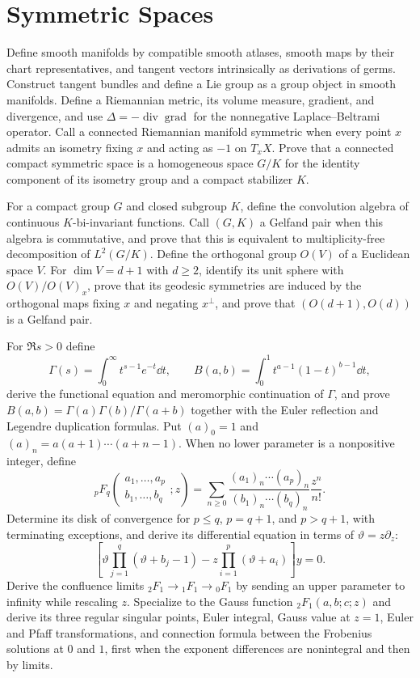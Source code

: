 \section{Symmetric Spaces}

\begin{exercise}
Define smooth manifolds by compatible smooth atlases, smooth maps by their
chart representatives, and tangent vectors intrinsically as derivations of
germs.  Construct tangent bundles and define a Lie group as a group object in
smooth manifolds.  Define a Riemannian metric, its volume measure, gradient,
and divergence, and use
$\Delta=-\operatorname{div}\operatorname{grad}$ for the nonnegative
Laplace--Beltrami operator.  Call a connected Riemannian manifold symmetric
when every point $x$ admits an isometry fixing $x$ and acting as $-1$ on
$T_xX$.  Prove that a connected compact symmetric space is a homogeneous
space $G/K$ for the identity component of its isometry group and a compact
stabilizer $K$.

For a compact group $G$ and closed subgroup $K$, define the convolution
algebra of continuous $K$-bi-invariant functions.  Call $(G,K)$ a Gelfand
pair when this algebra is commutative, and prove that this is equivalent to
multiplicity-free decomposition of $L^2(G/K)$.  Define the orthogonal group
$O(V)$ of a Euclidean space $V$.  For $\dim V=d+1$ with $d\geq2$, identify
its unit sphere with $O(V)/O(V)_x$, prove that its geodesic symmetries are induced by the
orthogonal maps fixing $x$ and negating $x^\perp$, and prove that
$(O(d+1),O(d))$ is a Gelfand pair.
\end{exercise}

\begin{exercise}
For $\Re s>0$ define
\[
 \Gamma(s)=\int_0^\infty t^{s-1}e^{-t}\dd t,
 \qquad
 B(a,b)=\int_0^1t^{a-1}(1-t)^{b-1}\dd t,
\]
derive the functional equation and meromorphic continuation of $\Gamma$, and
prove $B(a,b)=\Gamma(a)\Gamma(b)/\Gamma(a+b)$ together with the Euler
reflection and Legendre duplication formulas.  Put
$(a)_0=1$ and $(a)_n=a(a+1)\cdots(a+n-1)$.  When no lower parameter is a
nonpositive integer, define
\[
 {}_pF_q\!\left(\begin{matrix}a_1,\ldots,a_p\\b_1,\ldots,b_q\end{matrix};z\right)
 =\sum_{n\geq0}\frac{(a_1)_n\cdots(a_p)_n}
 {(b_1)_n\cdots(b_q)_n}\frac{z^n}{n!}.
\]
Determine its disk of convergence for $p\leq q$, $p=q+1$, and $p>q+1$, with
terminating exceptions, and derive its differential equation in terms of
$\vartheta=z\partial_z$:
\[
 \left[\vartheta\prod_{j=1}^q(\vartheta+b_j-1)
 -z\prod_{i=1}^p(\vartheta+a_i)\right]y=0.
\]
Derive the confluence limits ${}_2F_1\to{}_1F_1\to{}_0F_1$ by sending an
upper parameter to infinity while rescaling $z$.  Specialize to the Gauss
function ${}_2F_1(a,b;c;z)$ and
derive its three regular singular points, Euler integral, Gauss value at
$z=1$, Euler and Pfaff transformations, and connection formula between the
Frobenius solutions at $0$ and $1$, first when the exponent differences are
nonintegral and then by limits.
\end{exercise}

